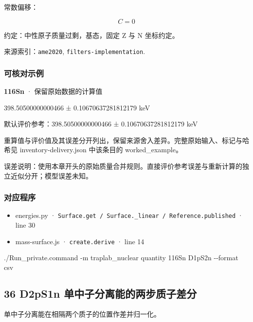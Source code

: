 \documentclass[
  11pt,
  letterpaper,
]{article}
\newenvironment{Shaded}{}{}
\newcommand{\AttributeTok}[1]{\textcolor[rgb]{0.49,0.56,0.16}{#1}}
\newcommand{\ExtensionTok}[1]{#1}
\newcommand{\NormalTok}[1]{#1}
\providecommand{\tightlist}{%
  \setlength{\itemsep}{0pt}\setlength{\parskip}{0pt}}
\begin{document}
常数偏移：

\[
C=0
\]

约定：中性原子质量过剩，基态，固定 Z 与 N 坐标约定。

来源索引：\texttt{ame2020}, \texttt{filters-implementation}.

\subsubsection{可核对示例}\label{ux53efux6838ux5bf9ux793aux4f8b-34}

\textbf{116Sn} · 保留原始数据的计算值

398.50500000000466 ± 0.10670637281812179 keV

默认评价参考：398.50500000000466 ± 0.10670637281812179 keV

重算值与评价值及其误差分开列出，保留来源舍入差异。完整原始输入、标记与哈希见
inventory-delivery.json 中该条目的 worked\_example。

误差说明：使用本章开头的原始质量合并规则。直接评价参考误差与重新计算的独立近似分开；模型误差未知。

\subsubsection{对应程序}\label{ux5bf9ux5e94ux7a0bux5e8f-34}

\begin{itemize}
\tightlist
\item
  energies.py ·
  \texttt{Surface.get\ /\ Surface.\_linear\ /\ Reference.published} ·
  line 30
\item
  mass-surface.js · \texttt{create.derive} · line 14
\end{itemize}

\begin{Shaded}
\begin{Highlighting}[]
\ExtensionTok{./Run\_private.command} \AttributeTok{{-}m}\NormalTok{ traplab\_nuclear quantity 116Sn D1pS2n }\AttributeTok{{-}{-}format}\NormalTok{ csv}
\end{Highlighting}
\end{Shaded}

\subsection{36 D2pS1n
单中子分离能的两步质子差分}\label{d2ps1n-ux5355ux4e2dux5b50ux5206ux79bbux80fdux7684ux4e24ux6b65ux8d28ux5b50ux5deeux5206}

单中子分离能在相隔两个质子的位置作差并归一化。
\end{document}
